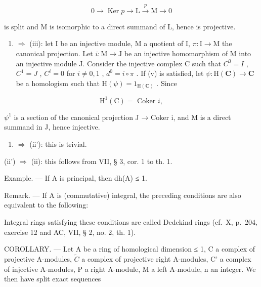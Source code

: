 \[
0 \rightarrow \operatorname{Ker} p \rightarrow \mathrm{L} \xrightarrow {p} \mathrm{M} \rightarrow 0
\]

is split and M is isomorphic to a direct summand of L, hence is projective.

\begin{enumerate}
\def\labelenumi{(\alph{enumi})}
\setcounter{enumi}{21}
\tightlist
\item
  \(\Rightarrow\) (iii): let I be an injective module, M a quotient of I, \(\pi : \mathrm{I} \to \mathrm{M}\) the canonical projection. Let \(i: \mathrm{M} \to \mathrm{J}\) be an injective homomorphism of M into an injective module J. Consider the injective complex C such that \(C^0 = I\) , \(C^1 = J\) , \(C^i = 0\) for \(i \neq 0, 1\) , \(d^0 = i \circ \pi\) . If (v) is satisfied, let \(\psi : \mathrm{H}(\mathbf{C}) \to \mathbf{C}\) be a homologism such that \(\mathrm{H}(\psi) = 1_{\mathrm{H}(\mathbf{C})}\) . Since
\end{enumerate}

\[
\mathrm{H} ^ {1} (\mathrm{C}) = \text { Coker } i  ,
\]

\(\psi^{1}\) is a section of the canonical projection J → Coker i, and M is a direct summand in J, hence injective.

\begin{enumerate}
\def\labelenumi{(\roman{enumi})}
\setcounter{enumi}{1}
\tightlist
\item
  \(\Rightarrow\) (ii'): this is trivial.
\end{enumerate}

(ii') \(\Rightarrow\) (ii): this follows from VII, § 3, cor. 1 to th. 1.

Example. --- If A is principal, then dh(A) ≤ 1.

Remark. --- If A is (commutative) integral, the preceding conditions are also equivalent to the following:

Integral rings satisfying these conditions are called Dedekind rings (cf.~X, p.~204, exercise 12 and AC, VII, § 2, no. 2, th. 1).

COROLLARY. --- Let A be a ring of homological dimension ≤ 1, C a complex of projective A-modules, \(\tilde{C}\) a complex of projective right A-modules, C' a complex of injective A-modules, P a right A-module, M a left A-module, n an integer. We then have split exact sequences

